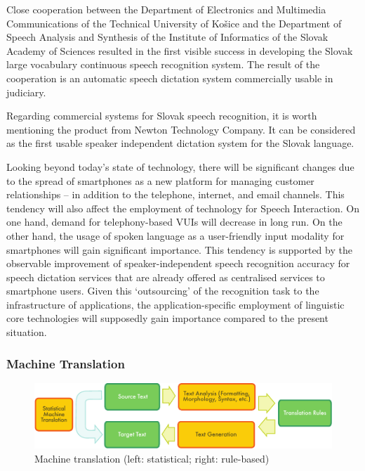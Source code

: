 \begin{multicols}{2}
Close cooperation between the Department of Electronics and Multimedia Communications of the Technical University of Košice and the Department of Speech Analysis and Synthesis of the Institute of Informatics of the Slovak Academy of Sciences resulted in the first visible success in developing the Slovak large vocabulary continuous speech recognition system. The result of the cooperation is an automatic speech dictation system commercially usable in judiciary.

Regarding commercial systems for Slovak speech recognition, it is worth mentioning the product from Newton Technology Company. It can be considered as the first usable speaker independent dictation system for the Slovak language.

Looking beyond today’s state of technology, there will be significant changes due to the spread of smartphones as a new platform for managing customer relationships – in addition to the telephone, internet, and email channels. This tendency will also affect the employment of technology for Speech Interaction. On one hand, demand for telephony-based VUIs will decrease in long run. On the other hand, the usage of spoken language as a user-friendly input modality for smartphones will gain significant importance. This tendency is supported by the observable improvement of speaker-independent speech recognition accuracy for speech dictation services that are already offered as centralised services to smartphone users. Given this ‘outsourcing’ of the recognition task to the infrastructure of applications, the application-specific employment of linguistic core technologies will supposedly gain importance compared to the present situation. 

\subsubsection{Machine Translation}

\begin{figure}[htb]
  \center
  \includegraphics[width=\textwidth]{../_media/english/machine_translation}
  \caption{Machine translation (left: statistical; right: rule-based)}
  \label{fig:mtarch_en}
\end{figure}


\end{multicols}

